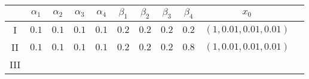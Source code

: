 \begin{table}[h]
	\centering
	\begin{tabular}{ccccccccccc}
	\toprule\midrule
	 & $\alpha_1$	& $\alpha_2$ & $\alpha_3$ & $\alpha_4$ & $\beta_1$ & $\beta_2$ & 
		$\beta_3$  & $\beta_4$ & $x_0$ \\ \midrule
	I & $0.1$&$0.1$&$0.1$&$0.1$ & $0.2$&$0.2$&$0.2$& $0.2$& $(1,0.01,0.01,0.01)$ \\
	II & $0.1$&$0.1$&$0.1$&$0.1$ & $0.2$&$0.2$&$0.2$& $0.8$& $(1,0.01,0.01,0.01)$ \\
	III \\
	\midrule\bottomrule
	\end{tabular}
	\label{tab:parameters}
\end{table}